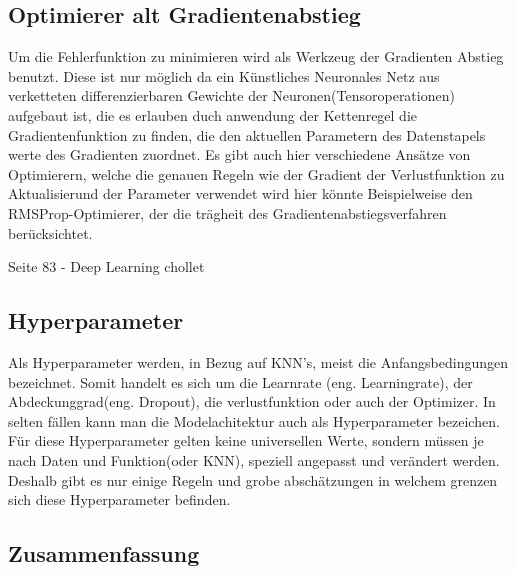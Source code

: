 \subsection{Optimierer alt Gradientenabstieg}
Um die Fehlerfunktion zu minimieren wird als Werkzeug der Gradienten Abstieg benutzt. Diese ist nur möglich da ein Künstliches Neuronales Netz aus verketteten differenzierbaren Gewichte der Neuronen(Tensoroperationen) aufgebaut ist, die es erlauben duch anwendung der Kettenregel die Gradientenfunktion zu finden, die den aktuellen Parametern des Datenstapels werte des Gradienten zuordnet. Es gibt auch hier verschiedene Ansätze von Optimierern, welche die genauen Regeln wie der Gradient der Verlustfunktion zu Aktualisierund der Parameter verwendet wird hier könnte Beispielweise den RMSProp-Optimierer, der die trägheit des Gradientenabstiegsverfahren berücksichtet.

Seite 83 - Deep Learning chollet

\subsection{Hyperparameter}
Als Hyperparameter werden, in Bezug auf KNN's, meist die Anfangsbedingungen bezeichnet. Somit handelt es sich um die Learnrate (eng. Learningrate), der Abdeckunggrad(eng. Dropout), die verlustfunktion oder auch der Optimizer. In selten fällen kann man die Modelachitektur auch als Hyperparameter bezeichen. Für diese Hyperparameter gelten keine universellen Werte, sondern müssen je nach Daten und Funktion(oder KNN), speziell angepasst und verändert werden. Deshalb gibt es nur einige Regeln und grobe abschätzungen in welchem grenzen sich diese Hyperparameter befinden. 

\subsection{Zusammenfassung}





